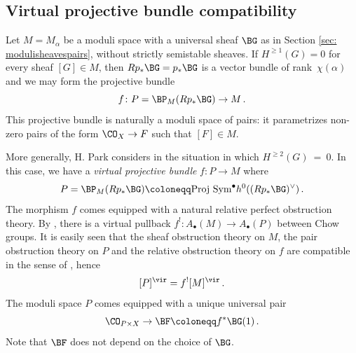 
\subsection{Virtual projective bundle compatibility}
\label{sec: virtualprojectivebundle}

Let $M=M_\alpha$ be a moduli space with a universal sheaf $\BG$ as in Section \ref{sec: modulisheavespairs}, without strictly semistable sheaves. If $H^{\geq 1}(G)=0$ for every sheaf $[G]\in M$, then $Rp_\ast \BG=p_\ast \BG$ is a vector bundle of rank~$\chi(\alpha)$ and we may form the projective bundle
\[f\colon P=\BP_M(Rp_\ast \BG)\to M\,.\]
This projective bundle is naturally a moduli space of pairs: it parametrizes non-zero pairs of the form $\CO_X\to F$ such that $[F]\in M$.

More generally, H. Park considers in \cite[Section 4]{park} the situation in which $H^{\geq 2}(G)~=~0$. In this case, we have a \textit{virtual projective bundle} $f\colon P\to M$
where
\[P=\BP_M(Rp_\ast\BG)\coloneqq \textup{Proj Sym}^\bullet h^0((Rp_\ast \BG)^\vee)\,.\]
The morphism $f$ comes equipped with a natural relative perfect obstruction theory. By \cite{manolache}, there is a virtual pullback $f^!\colon A_\bullet(M)\to A_\bullet(P)$ between Chow groups. It is easily seen that the sheaf obstruction theory on $M$, the pair obstruction theory on $P$ and the relative obstruction theory on $f$ are compatible in the sense of \cite[Corollary 4.9]{manolache}, hence
\[[P]^\vir=f^![M]^\vir\,.\]
The moduli space $P$ comes equipped with a unique universal pair
\[\CO_{P\times X}\to \BF\coloneqq f^\ast\BG(1)\,.\]
Note that $\BF$ does not depend on the choice of $\BG$.

